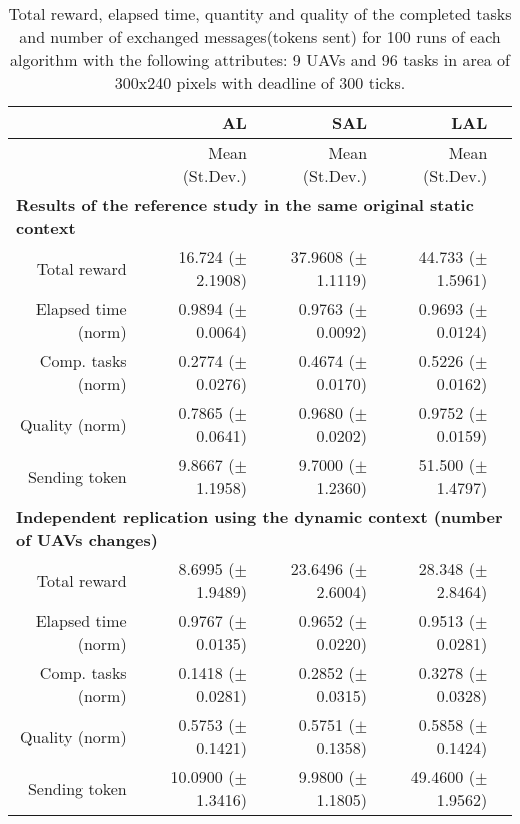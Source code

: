 \begin{table}%
	\small
	\fontsize{6}{6}\selectfont
	\centering
	\caption{Total reward, elapsed time, quantity and quality of the completed tasks and number of exchanged messages(tokens sent) for 100 runs of each algorithm with the following attributes: 9 UAVs and 96 tasks in area of 300x240 pixels with deadline of 300 ticks.}
	\label{table:table01}
	
	\begin{tabular}{rrrrr} \hline
		& AL
		& SAL
		& LAL \\ \hline 
		
		& Mean (St.Dev.)  & Mean (St.Dev.)  & Mean (St.Dev.)  \\ [1ex]
		
		\multicolumn{5}{l}{\textbf{Results of the reference study in the same original static context}} \\
	Total reward           & 16.724   ($\pm$2.1908)  & 37.9608  ($\pm$1.1119) & 44.733  ($\pm$1.5961)   \\
	Elapsed time (norm)    & 0.9894   ($\pm$0.0064)  &  0.9763  ($\pm$0.0092) & 0.9693  ($\pm$0.0124)    \\ 
	Comp. tasks (norm)     & 0.2774   ($\pm$0.0276)  &  0.4674  ($\pm$0.0170) & 0.5226  ($\pm$0.0162)    \\ 
	Quality (norm)         & 0.7865   ($\pm$0.0641)  &  0.9680  ($\pm$0.0202) & 0.9752  ($\pm$0.0159)   \\ 
	Sending token          &  9.8667  ($\pm$1.1958)  &  9.7000  ($\pm$1.2360) & 51.500 ($\pm$1.4797)   \\ [1ex]
		
		\multicolumn{5}{l}{\textbf{Independent replication using the dynamic context (number of UAVs changes)}} \\
	Total reward           & 8.6995  ($\pm$1.9489)  & 23.6496 ($\pm$2.6004) &  28.348  ($\pm$2.8464)  \\
	Elapsed time (norm)    & 0.9767  ($\pm$0.0135)  & 0.9652  ($\pm$0.0220) &  0.9513  ($\pm$0.0281)  \\ 
	Comp. tasks (norm)     & 0.1418  ($\pm$0.0281)  & 0.2852  ($\pm$0.0315) &  0.3278  ($\pm$0.0328)  \\ 
	Quality (norm)         & 0.5753  ($\pm$0.1421)  & 0.5751  ($\pm$0.1358) &  0.5858  ($\pm$0.1424)  \\ 
	Sending token          & 10.0900 ($\pm$1.3416)  & 9.9800  ($\pm$1.1805) &  49.4600 ($\pm$1.9562)  \\ [1ex]

		\hline
	\end{tabular}
\end{table} 




